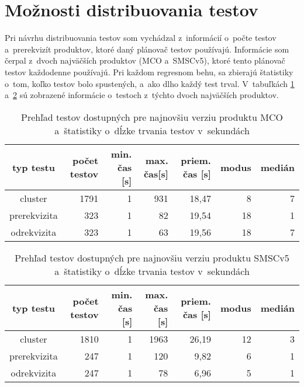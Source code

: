 \section{Možnosti distribuovania testov}
\label{sekcia:moznosti_distribuovania}
Pri návrhu distribuovania testov som vychádzal z~informácií o~počte testov a~prerekvizít produktov,
ktoré daný plánovač testov používajú. Informácie som čerpal z~dvoch najväčších produktov (MCO a~SMSCv5), 
ktoré tento plánovač testov každodenne používajú. Pri každom regresnom behu, sa zbierajú štatistiky o~tom,
koľko testov bolo spustených, a~ako dlho každý test trval. 
V~tabuľkách \ref{tabulka:testy_mco} a~\ref{tabulka:testy_smsc} sú zobrazené informácie o~testoch z~týchto dvoch najväčších produktov.

\begin{table}
  \begin{center}
    \begin{tabular}{| c | r | r | r | r | r | r |}
    \hline
    typ testu & počet testov & min. čas [s] & max. čas[s] & priem. čas [s] & modus & medián \\ \hline
    cluster      & 1791 & 1 & 931 & 18,47 & 8  & 7 \\ \hline
    prerekvizita & 323  & 1 & 82  & 19,54 & 18 & 1 \\ \hline
    odrekvizita  & 323  & 1 & 63  & 19,56 & 18 & 7 \\
    \hline
    \end{tabular}
    \caption{Prehľad testov dostupných pre najnovšiu verziu produktu MCO a~štatistiky o~dĺzke trvania testov v~sekundách}
    \label{tabulka:testy_mco}
  \end{center}
\end{table}

\begin{table}
  \begin{center}
    \begin{tabular}{| c | r | r | r | r | r | r |}
    \hline
    typ testu & počet testov & min. čas [s] & max. čas [s] & priem. čas [s] & modus & medián \\ \hline
    cluster      & 1810 & 1 & 1963 & 26,19 & 12 & 3 \\ \hline
    prerekvizita & 247  & 1 & 120  & 9,82  & 6  & 1 \\ \hline
    odrekvizita  & 247  & 1 & 78   & 6,96  & 5  & 1 \\
    \hline
    \end{tabular}
    \caption{Prehľad testov dostupných pre najnovšiu verziu produktu SMSCv5 a~štatistiky o~dĺzke trvania testov v~sekundách}
    \label{tabulka:testy_smsc}
  \end{center}
\end{table}

